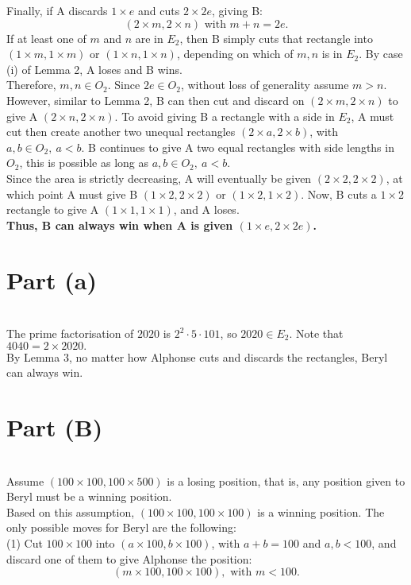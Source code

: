 \documentclass{article}
\begin{document}
Finally, if A discards $1\times e$ and cuts $2\times 2e$, giving B:
$$(2\times m, 2\times n)\text{ with } m + n = 2e.$$
If at least one of $m$ and $n$ are in $E_2$, then B simply cuts that rectangle into $( 1\times m, 1\times m )$ or $( 1\times n, 1\times n )$, depending on which of $m,n$ is in $E_2$. By case (i) of Lemma 2, A loses and B wins. \\

Therefore, $m,n \in O_2$. Since $2e \in O_2$, without loss of generality assume $m > n$. However, similar to Lemma 2, B can then cut and discard on $(2\times m, 2\times n)$ to give A $(2\times n, 2\times n)$. To avoid giving B a rectangle with a side in $E_2$, A must cut then create another two unequal rectangles $(2\times a, 2\times b)$, with $a,b \in O_2,\ a < b$. B continues to give A two equal rectangles with side lengths in $O_2$, this is possible as long as $a,b \in O_2,\ a < b$. \\

Since the area is strictly decreasing, A will eventually be given $(2\times 2, 2\times 2)$, at which point A must give B $(1\times 2, 2\times 2)$ or $(1\times 2, 1\times 2)$. Now, B cuts a $1\times 2$ rectangle to give A $(1\times 1, 1\times 1)$, and A loses. \\

\textbf{Thus, B can always win when A is given $(1\times e, 2\times 2 e)$.}
\section*{Part (a)}
 \\

The prime factorisation of $2020$ is $2^2\cdot 5 \cdot 101$, so $2020 \in E_2$. Note that $4040 = 2\times 2020.$\\
By Lemma 3, no matter how Alphonse cuts and discards the rectangles, Beryl can always win.

\section*{Part (B)}
 \\

Assume $(100\times 100, 100\times 500)$ is a losing position, that is, any position given to Beryl must be a winning position. \\
Based on this assumption, $(100\times 100, 100\times 100)$ is a winning position. The only possible moves for Beryl are the following: \\
(1) Cut $100\times 100$ into $(a\times 100, b\times 100)$, with $a+b=100$ and $a,b<100$, and discard one of them to give Alphonse the position:
$$(m\times100,100\times100),\text{ with } m < 100.$$
\end{document}
